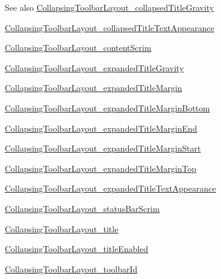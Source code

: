 \begin{DoxySeeAlso}{See also}
\hyperlink{classproject4_1_1xaria_1_1R_1_1styleable_a15ca5722add659943b94aec2b6f66a19}{Collapsing\+Toolbar\+Layout\+\_\+collapsed\+Title\+Gravity} 

\hyperlink{classproject4_1_1xaria_1_1R_1_1styleable_a5d38cc3ee657b1c221bbd1c59349c1a8}{Collapsing\+Toolbar\+Layout\+\_\+collapsed\+Title\+Text\+Appearance} 

\hyperlink{classproject4_1_1xaria_1_1R_1_1styleable_aafc0ee2f0a373dd6bea4534c79ce24e2}{Collapsing\+Toolbar\+Layout\+\_\+content\+Scrim} 

\hyperlink{classproject4_1_1xaria_1_1R_1_1styleable_a9a4dfbfaf067b89d3e998221b667aae4}{Collapsing\+Toolbar\+Layout\+\_\+expanded\+Title\+Gravity} 

\hyperlink{classproject4_1_1xaria_1_1R_1_1styleable_a32e897c7aed6567462eb91ece9f149d4}{Collapsing\+Toolbar\+Layout\+\_\+expanded\+Title\+Margin} 

\hyperlink{classproject4_1_1xaria_1_1R_1_1styleable_ab15616401f9effe51d0c5ab4df6399a5}{Collapsing\+Toolbar\+Layout\+\_\+expanded\+Title\+Margin\+Bottom} 

\hyperlink{classproject4_1_1xaria_1_1R_1_1styleable_add3700a4da95b0e9fe9cc81beada966b}{Collapsing\+Toolbar\+Layout\+\_\+expanded\+Title\+Margin\+End} 

\hyperlink{classproject4_1_1xaria_1_1R_1_1styleable_a0dbfb6e3b88ea621358c4ea2f5acc61f}{Collapsing\+Toolbar\+Layout\+\_\+expanded\+Title\+Margin\+Start} 

\hyperlink{classproject4_1_1xaria_1_1R_1_1styleable_acac04a3f2f5421067c31e2d58d3df10d}{Collapsing\+Toolbar\+Layout\+\_\+expanded\+Title\+Margin\+Top} 

\hyperlink{classproject4_1_1xaria_1_1R_1_1styleable_ac2f467b39d5a7471793b18c31578d5a8}{Collapsing\+Toolbar\+Layout\+\_\+expanded\+Title\+Text\+Appearance} 

\hyperlink{classproject4_1_1xaria_1_1R_1_1styleable_ab62e197d13af2c0b8dee73ebe8c76191}{Collapsing\+Toolbar\+Layout\+\_\+status\+Bar\+Scrim} 

\hyperlink{classproject4_1_1xaria_1_1R_1_1styleable_a16736e7389574011ed56270a9c883976}{Collapsing\+Toolbar\+Layout\+\_\+title} 

\hyperlink{classproject4_1_1xaria_1_1R_1_1styleable_a936dff2d19d66a8cbd916542670a8ce1}{Collapsing\+Toolbar\+Layout\+\_\+title\+Enabled} 

\hyperlink{classproject4_1_1xaria_1_1R_1_1styleable_a0a1865ab13f923df3c8b09029e0f7e01}{Collapsing\+Toolbar\+Layout\+\_\+toolbar\+Id} 
\end{DoxySeeAlso}
\mbox{\label{classproject4_1_1xaria_1_1R_1_1styleable_a15ca5722add659943b94aec2b6f66a19}} 
